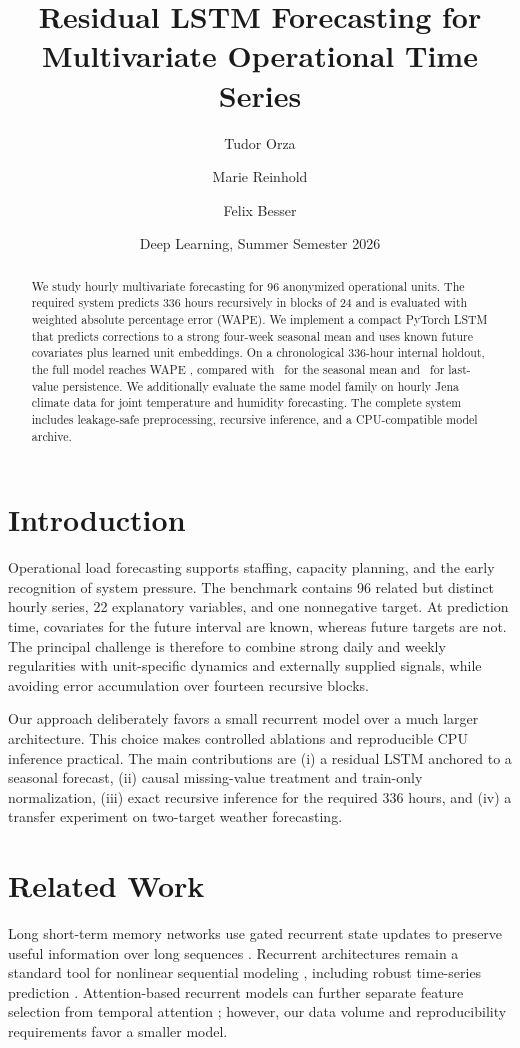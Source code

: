 \documentclass[10pt,a4paper]{article}
\title{Residual LSTM Forecasting for Multivariate Operational Time Series}
\author{Tudor Orza \and Marie Reinhold \and Felix Besser}
\date{Deep Learning, Summer Semester 2026}
\begin{document}
\maketitle

\begin{abstract}
We study hourly multivariate forecasting for 96 anonymized operational units.
The required system predicts 336 hours recursively in blocks of 24 and is
evaluated with weighted absolute percentage error (WAPE). We implement a compact
PyTorch LSTM that predicts corrections to a strong four-week seasonal mean and
uses known future covariates plus learned unit embeddings. On a chronological
336-hour internal holdout, the full model reaches WAPE \FullWAPE, compared with
\SeasonalWAPE\ for the seasonal mean and \LastWAPE\ for last-value persistence.
We additionally evaluate the same model family on hourly Jena climate data for
joint temperature and humidity forecasting. The complete system includes
leakage-safe preprocessing, recursive inference, and a CPU-compatible model
archive.
\end{abstract}

\section{Introduction}
Operational load forecasting supports staffing, capacity planning, and the
early recognition of system pressure. The benchmark contains 96 related but
distinct hourly series, 22 explanatory variables, and one nonnegative target.
At prediction time, covariates for the future interval are known, whereas future
targets are not. The principal challenge is therefore to combine strong daily
and weekly regularities with unit-specific dynamics and externally supplied
signals, while avoiding error accumulation over fourteen recursive blocks.

Our approach deliberately favors a small recurrent model over a much larger
architecture. This choice makes controlled ablations and reproducible CPU
inference practical. The main contributions are (i) a residual LSTM anchored to
a seasonal forecast, (ii) causal missing-value treatment and train-only
normalization, (iii) exact recursive inference for the required 336 hours, and
(iv) a transfer experiment on two-target weather forecasting.

\section{Related Work}
Long short-term memory networks use gated recurrent state updates to preserve
useful information over long sequences \cite{hochreiter1997lstm}. Recurrent
architectures remain a standard tool for nonlinear sequential modeling
\cite{mienye2024rnn}, including robust time-series prediction
\cite{connor1994robust}. Attention-based recurrent models can further separate
feature selection from temporal attention \cite{qin2017dual}; however, our data
volume and reproducibility requirements favor a smaller model.
\end{document}
